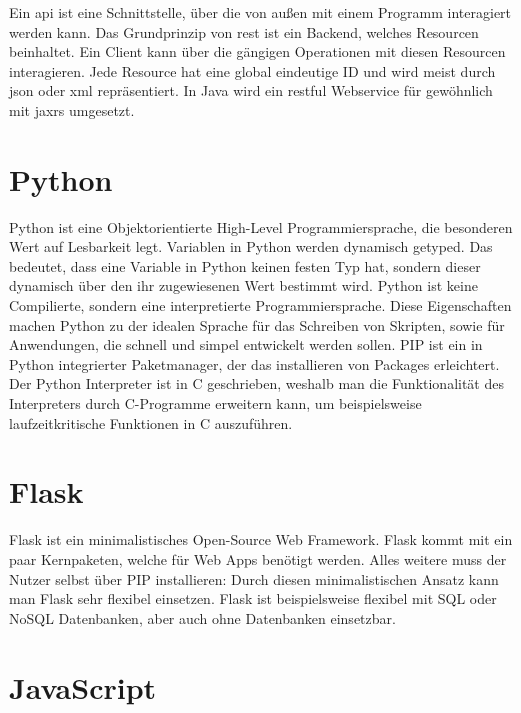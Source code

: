 Ein \ac{api} ist eine Schnittstelle, über die von außen mit einem Programm interagiert werden kann.
Das Grundprinzip von \ac{rest} ist ein Backend, welches Resourcen beinhaltet.
Ein Client kann über die gängigen  Operationen mit diesen Resourcen interagieren.
Jede Resource hat eine global eindeutige ID und wird meist durch \ac{json} oder \ac{xml} repräsentiert.
In Java wird ein \ac{rest}ful Webservice für gewöhnlich mit \ac{jaxrs} umgesetzt.
~\autocite{schiesser:javaEE7}

\section{Python}
\label{sec:python}

Python ist eine Objektorientierte High-Level Programmiersprache, die besonderen Wert auf Lesbarkeit legt.
Variablen in Python werden dynamisch getyped.
Das bedeutet, dass eine Variable in Python keinen festen Typ hat, sondern dieser dynamisch über den ihr zugewiesenen Wert bestimmt wird.
Python ist keine Compilierte, sondern eine interpretierte Programmiersprache.
Diese Eigenschaften machen Python zu der idealen Sprache für das Schreiben von Skripten, sowie für Anwendungen, die schnell und simpel entwickelt werden sollen.
PIP ist ein in Python integrierter Paketmanager, der das installieren von Packages erleichtert.
Der Python Interpreter ist in C geschrieben, weshalb man die Funktionalität des Interpreters durch C-Programme erweitern kann, um beispielsweise laufzeitkritische Funktionen in C auszuführen.
~\autocite{van:python}

\section{Flask}
\label{sec:flask}

Flask ist ein minimalistisches Open-Source Web Framework.
Flask kommt mit ein paar Kernpaketen, welche für Web Apps benötigt werden.
Alles weitere muss der Nutzer selbst über PIP installieren:
Durch diesen minimalistischen Ansatz kann man Flask sehr flexibel einsetzen.
Flask ist beispielsweise flexibel mit SQL oder NoSQL Datenbanken, aber auch ohne Datenbanken einsetzbar.
~\autocite{grindberg:flask}


\section{JavaScript}
\label{sec:js}

